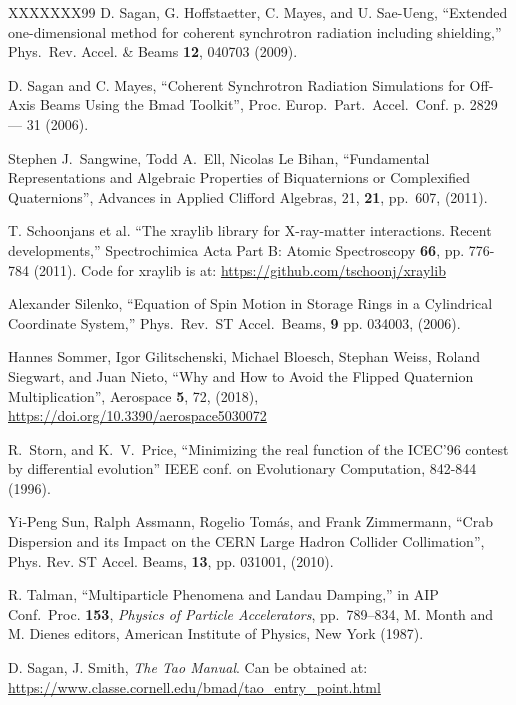 \begin{thebibliography}{XXXXXXX99}
D. Sagan, G. Hoffstaetter, C. Mayes, and U. Sae-Ueng,
``Extended one-dimensional method for coherent synchrotron radiation including shielding,''
Phys.\ Rev. Accel. \& Beams {\bf 12}, 040703 (2009).

D. Sagan and C. Mayes, 
``Coherent Synchrotron Radiation Simulations for Off-Axis Beams Using the Bmad Toolkit'',
Proc. Europ.\ Part.\ Accel.\ Conf. p. 2829 --- 31 (2006).

Stephen J.\ Sangwine, Todd A.\ Ell, Nicolas Le Bihan, 
``Fundamental Representations and Algebraic Properties of Biquaternions or Complexified Quaternions'',
Advances in Applied Clifford Algebras, 21, {\bf 21}, pp.~607, (2011).

T. Schoonjans et al. ``The xraylib library for X-ray-matter
interactions. Recent developments,'' Spectrochimica Acta Part B: Atomic
Spectroscopy {\bf 66}, pp. 776-784 (2011).
Code for xraylib is at: \hfill\break
\hspace*{0.3in}
\url{https://github.com/tschoonj/xraylib}

Alexander Silenko, 
``Equation of Spin Motion in Storage Rings in a Cylindrical Coordinate System,''
Phys.\ Rev.\ ST Accel.\ Beams, {\bf 9} pp. 034003, (2006).

Hannes Sommer, Igor Gilitschenski, Michael Bloesch, Stephan Weiss, Roland Siegwart, and Juan Nieto,
``Why and How to Avoid the Flipped Quaternion Multiplication'',
Aerospace {\bf 5}, 72, (2018), \hfill\break
\hspace*{0.3in}
\url{https://doi.org/10.3390/aerospace5030072}

R.~Storn, and K.~V.~Price, ``Minimizing the real function of the
ICEC'96 contest by differential evolution'' IEEE conf. on Evolutionary
Computation, 842-844 (1996).

Yi-Peng Sun, Ralph Assmann, Rogelio Tom\'as, and Frank Zimmermann,
``Crab Dispersion and its Impact on the CERN Large Hadron Collider Collimation'',
Phys. Rev. ST Accel. Beams, {\bf 13}, pp. 031001, (2010).

 R. Talman, ``Multiparticle Phenomena and
Landau Damping,'' in AIP Conf.\ Proc.  {\bf 153}, {\em Physics of
Particle Accelerators}, pp.~789--834, M. Month and M. Dienes editors,
American Institute of Physics, New York (1987).

D. Sagan, J. Smith, {\it The Tao Manual}.
Can be obtained at: \hfill\break
\hspace*{0.3in}
\url{https://www.classe.cornell.edu/bmad/tao_entry_point.html}


\end{thebibliography}
